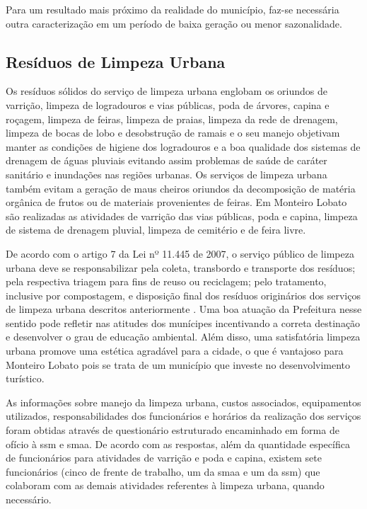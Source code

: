 	
	Para um resultado mais próximo da realidade do município, faz-se necessária outra caracterização em um período de baixa geração ou menor sazonalidade.
	
	\subsection{Resíduos de Limpeza Urbana}
	
	Os resíduos sólidos do serviço de limpeza urbana englobam os oriundos de varrição, limpeza de logradouros e vias públicas, poda de árvores, capina e roçagem, limpeza de feiras, limpeza de praias, limpeza da rede de drenagem, limpeza de bocas de lobo e desobstrução de ramais \cite{brasil:12305, brasil:11445, ibam:2001} e o seu manejo objetivam manter as condições de higiene dos logradouros e a boa qualidade dos sistemas de drenagem de águas pluviais evitando assim problemas de saúde de caráter sanitário e inundações nas regiões urbanas. Os serviços de limpeza urbana também evitam a geração de maus cheiros oriundos da decomposição de matéria orgânica de frutos ou de materiais provenientes de feiras. Em Monteiro Lobato são realizadas as atividades de varrição das vias públicas, poda e capina, limpeza de sistema de drenagem pluvial, limpeza de cemitério e de feira livre.
	
	De acordo com o artigo 7 da Lei nº 11.445 de 2007, o serviço público de limpeza urbana deve se responsabilizar pela coleta, transbordo e transporte dos resíduos; pela respectiva triagem para fins de reuso ou reciclagem; pelo tratamento, inclusive por compostagem, e disposição final dos resíduos originários dos serviços de limpeza urbana descritos anteriormente \cite{brasil:11445}. Uma boa atuação da Prefeitura nesse sentido pode refletir nas atitudes dos munícipes incentivando a correta destinação e desenvolver o grau de educação ambiental. Além disso, uma satisfatória limpeza urbana promove uma estética agradável para a cidade, o que é vantajoso para Monteiro Lobato pois se trata de um município que investe no desenvolvimento turístico.
	 
	As informações sobre manejo da limpeza urbana, custos associados, equipamentos utilizados, responsabilidades dos funcionários e horários da realização dos serviços foram obtidas através de questionário estruturado encaminhado em forma de ofício à \gls{ssm} e \gls{smaa}. De acordo com as respostas, além da quantidade específica de funcionários para atividades de varrição e poda e capina, existem sete funcionários (cinco de frente de trabalho, um da \gls{smaa} e um da \gls{ssm}) que colaboram com as demais atividades referentes à limpeza urbana, quando necessário.
	
